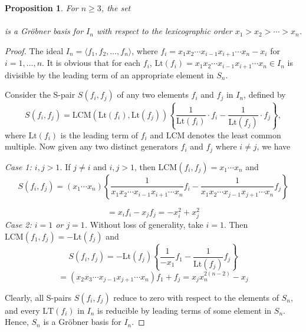 \documentclass[11pt]{amsart}
\theoremstyle{plain}
\newtheorem{prop}[theorem]{Proposition}
\theoremstyle{definition}
\theoremstyle{remark}
\begin{document}
\begin{prop} 
	\label{prop:generating-set}
	For \(n \geq 3\), the set\\ \\ is a Gr\"{o}bner basis for \(I_n\) with respect to the lexicographic order \( x_1 > x_2 > \cdots > x_n \). 
\end{prop}
\begin{proof}
	The ideal \( I_n = \langle f_1, f_2, \dots, f_n \rangle \), where \( f_i = x_1x_2 \cdots x_{i-1} x_{i+1} \cdots x_n - x_i \) for \( i = 1, \dots, n \). It is obvious that for each \(f_i\), \( \text{Lt}(f_i) = x_1x_2\cdots x_{i-1}x_{i+1}\cdots x_n \in I_n \) is divisible by the leading term of an appropriate element in \( S_n \). 
	
	Consider the S-pair \( S(f_i, f_j) \) of any two elements \( f_i \) and \( f_j \) in \( I_n \), defined by
	\[
	S(f_i, f_j) = \text{LCM}(\text{Lt}(f_i), \text{Lt}(f_j))\left\{\frac{1}{\text{Lt}(f_i)} \cdot f_i - \frac{1}{\text{Lt}(f_j)} \cdot f_j\right\},
	\]
	where \( \text{Lt}(f_i) \) is the leading term of \( f_i \) and \( \text{LCM} \) denotes the least common multiple. Now given any two distinct generators \( f_i\) and \(f_j\) where \(i \neq j \), we have
	
	\noindent \textit{Case 1: \( i, j > 1 \).} If \( j \neq i \) and \( i, j > 1 \), then	\( \text{LCM}(f_i,f_j) = x_1\cdots x_n \) and
	\[
	S(f_i,f_j)=(x_1\cdots x_n) \left\{ \frac{1}{x_1x_2 \cdots x_{i-1}x_{i+1}\cdots x_n}f_i - \frac{1}{x_1x_2 \cdots x_{j-1}x_{j+1}\cdots x_n}f_j \right\} 
	\]
	
	\[
	=x_if_i-x_jf_j= -x_i^2+x_j^2
	\]
	\noindent \textit{Case 2: \( i =1 \) or \( j = 1 \).} Without loss of generality, take \( i = 1 \). Then	\( \text{LCM}(f_1,f_j) = - \text{Lt}(f_j) \) and
	\[
	S(f_i,f_j)=- \text{Lt}(f_j) \left\{ \frac{1}{- x_1}f_1 - \frac{1}{ \text{Lt}(f_j)}f_j \right\} 
	\]
	\[
	=(x_2x_3\cdots x_{j-1}x_{j+1}\cdots x_n) f_1 + f_j= x_jx_n^{2(n-2)}-x_j
	\]
	
	Clearly, all S-pairs \( S(f_i, f_j) \) reduce to zero with respect to the elements of \( S_n \), and every \(\text{LT}(f_i)\) in \( I_n \) is reducible by leading terms of some element in \( S_n \). Hence, \( S_n \) is a Gr\"{o}bner basis for \( I_n \).
	
\end{proof}
\end{document}
